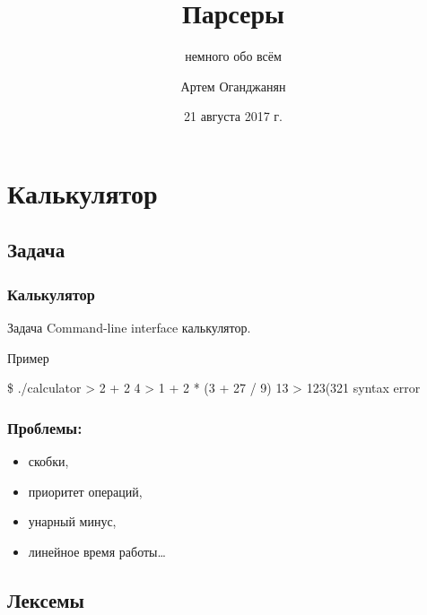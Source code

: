 \documentclass[pdf,russian]{beamer}
\title{Парсеры}
\subtitle{немного обо всём}
\author{Артем Оганджанян}
\institute{ЛОЛ-2017}
\date{21 августа 2017 г.}
\begin{document}

\begin{frame}
    \titlepage
\end{frame}

\section{Калькулятор}
\subsection{Задача}

\begin{frame}[fragile]
    \frametitle{Калькулятор}
    \begin{block}{Задача}
        Command-line interface калькулятор.
    \end{block}

    \pause

    \begin{exampleblock}{Пример}
        \begin{semiverbatim}
\$ ./calculator
> 2 + 2
4
> 1 + 2 * (3 + 27 / 9)
13
> 123(321
syntax error
        \end{semiverbatim}
    \end{exampleblock}
\end{frame}

\begin{frame}
    \frametitle{Проблемы:}
    \pause
    \begin{itemize}
        \item скобки,
        \pause
        \item приоритет операций,
        \pause
        \item унарный минус,
        \pause
        \item линейное время работы\dots
    \end{itemize}
\end{frame}

\subsection{Лексемы}
\end{document}
